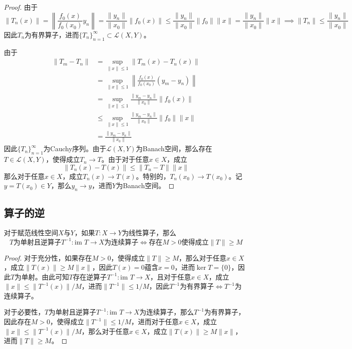 \documentclass[lang = cn, scheme = chinese, thmcnt = section]{elegantbook}
\newcommand{\sub}{\subset}             %
\newcommand{\im}{\text{im }}           %
\begin{document}
\begin{proof}
	由于
	$$
	\|T_n(x)\|
	=\left\| \frac{f_0(x)}{f_0(x_0)}y_n \right\|
	=\frac{\|y_n\|}{\|x_0\|}\|f_0(x)\|
	\le \frac{\|y_n\|}{\|x_0\|}\|f_0\|\|x\|
	= \frac{\|y_n\|}{\|x_0\|}\|x\|
	\implies 
	\|T_n\|\le \frac{\|y_n\|}{\|x_0\|}
	$$
	因此$T_n$为有界算子，进而$\{T_n\}_{n=1}^{\infty}\sub \mathcal{L}(X,Y)$。
	
	由于
	\begin{align*}
		\|T_m-T_n\|
		& = \sup_{\|x\|\le 1}\|T_m(x)-T_n(x)\|\\
		& = \sup_{\|x\|\le 1}\left\| \frac{f_0(x)}{f_0(x_0)}(y_m-y_n) \right\|\\
		& = \sup_{\|x\|\le 1}\frac{\|y_m-y_n\|}{\|x_0\|}\|f_0(x)\|\\
		& \le \sup_{\|x\|\le 1}\frac{\|y_m-y_n\|}{\|x_0\|}\|f_0\|\|x\|\\
		& = \frac{\|y_m-y_n\|}{\|x_0\|}
	\end{align*}
	因此$\{T_n\}_{n=1}^{\infty}$为Cauchy序列。由于$\mathcal{L}(X,Y)$为Banach空间，那么存在$T\in \mathcal{L}(X,Y)$，使得成立$T_n\to T$。由于对于任意$x\in X$​，成立
	$$
	\|T_n(x)-T(x)\|\le \|T_n-T\|\|x\|
	$$
	那么对于任意$x\in X$，成立$T_n(x)\to T(x)$。特别的，$T_n(x_0)\to T(x_0)$。记$y=T(x_0)\in Y$，那么$y_n\to y$，进而$Y$为Banach空间。
\end{proof}

\subsection{算子的逆}

\begin{proposition}
	对于赋范线性空间$X$与$Y$，如果$T:X\to Y$为线性算子，那么
	$$
	T\text{为单射且逆算子}T^{-1}:\im T\to X\text{为连续算子}\iff\text{存在}M>0\text{使得成立}\|T\|\ge M
	$$
\end{proposition}

\begin{proof}
	对于充分性，如果存在$M>0$，使得成立$\|T\|\ge M$，那么对于任意$x\in X$，成立$\|T(x)\|\ge M\|x\|$，因此$T(x)=0$蕴含$x=0$，进而$\ker T=\{0\}$，因此$T$为单射。由此可知$T$存在逆算子$T^{-1}:\im T\to X$，且对于任意$x\in X$，成立$\|x\|\le \|T^{-1}(x)\|/M$，进而$\|T^{-1}\|\le1/M$，因此$T^{-1}$为有界算子$\iff T^{-1}$为连续算子。
	
	对于必要性，$T$为单射且逆算子$T^{-1}:\im T\to X$为连续算子，那么$T^{-1}$为有界算子，因此存在$M>0$，使得成立$\|T^{-1}\|\le1/M$，进而对于任意$x\in X$，成立$\|x\|\le \|T^{-1}(x)\|/M$，那么对于任意$x\in X$，成立$\|T(x)\|\ge M\|x\|$，进而$\|T\|\ge M$。
\end{proof}
\end{document}
